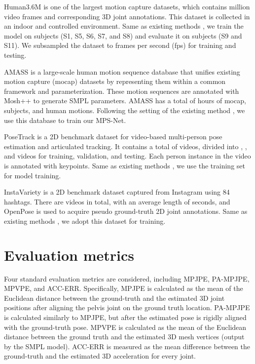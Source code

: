 \documentclass[10pt,twocolumn,letterpaper]{article}
\begin{document}
\vspace{5pt} Human3.6M \cite{h36m_pami} is one of the largest motion capture datasets, which contains  million video frames and corresponding 3D joint annotations. This dataset is collected in an indoor and controlled environment. Same as existing methods \cite{Kocabas2020VIBEVI,choi2020beyond}, we train the model on  subjects (\ie S1, S5, S6, S7, and S8) and evaluate it on  subjects (\ie S9 and S11). We subsampled the dataset to  frames per second (fps) for training and testing.

\vspace{5pt} AMASS \cite{Mahmood2019AMASSAO} is a large-scale human motion sequence database that unifies  existing motion capture (mocap) datasets by representing them within a common framework and parameterization. These motion sequences are annotated with Mosh++ to generate SMPL parameters. AMASS has a total of  hours of mocap,  subjects, and  human motions. Following the setting of the existing method \cite{Kocabas2020VIBEVI}, we use this database to train our MPS-Net.

\vspace{5pt} PoseTrack \cite{Andriluka_2018_CVPR} is a 2D benchmark dataset for video-based multi-person pose estimation and articulated tracking. It contains a total of  videos, divided into , , and  videos for training, validation, and testing. Each person instance in the video is annotated with  keypoints. Same as existing methods \cite{Kocabas2020VIBEVI,choi2020beyond}, we use the training set for model training.

\vspace{5pt} InstaVariety \cite{Kanazawa2019Learning3H} is a 2D benchmark dataset captured from Instagram using 84 hashtags. There are  videos in total, with an average length of  seconds, and OpenPose \cite{Cao2017RealtimeM2} is used to acquire pseudo ground-truth 2D joint annotations. Same as existing methods \cite{Kocabas2020VIBEVI,choi2020beyond}, we adopt this dataset for training.

\section{Evaluation metrics}

Four standard evaluation metrics \cite{Kocabas2020VIBEVI,choi2020beyond,Luo_2020_ACCV} are considered, including MPJPE, PA-MPJPE, MPVPE, and ACC-ERR. Specifically, MPJPE is calculated as the mean of the Euclidean distance between the ground-truth and the estimated 3D joint positions after aligning the pelvis joint on the ground truth location. PA-MPJPE is calculated similarly to MPJPE, but after the estimated pose is rigidly aligned with the ground-truth pose. MPVPE is calculated as the mean of the Euclidean distance between the ground truth and the estimated 3D mesh vertices (output by the SMPL model). ACC-ERR is measured as the mean difference between the ground-truth and the estimated 3D acceleration for every joint.
\end{document}
